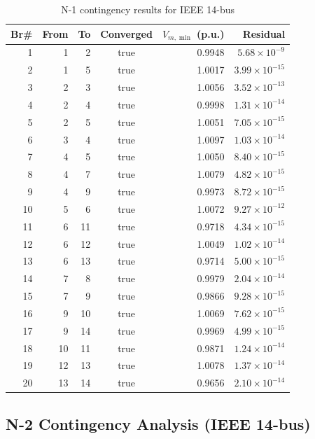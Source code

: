 \documentclass[11pt]{article}
\begin{document}
\begin{table}[h]
\centering
\caption{N-1 contingency results for IEEE 14-bus}
\label{tab:n1_contingency}
\small
\begin{tabular}{r r r c r r}
\toprule
Br\# & From & To & Converged & $V_{m,\min}$ (p.u.) & Residual \\
\midrule
 1 &  1 &  2 & true & 0.9948 & $5.68 \times 10^{-9}$ \\
 2 &  1 &  5 & true & 1.0017 & $3.99 \times 10^{-15}$ \\
 3 &  2 &  3 & true & 1.0056 & $3.52 \times 10^{-13}$ \\
 4 &  2 &  4 & true & 0.9998 & $1.31 \times 10^{-14}$ \\
 5 &  2 &  5 & true & 1.0051 & $7.05 \times 10^{-15}$ \\
 6 &  3 &  4 & true & 1.0097 & $1.03 \times 10^{-14}$ \\
 7 &  4 &  5 & true & 1.0050 & $8.40 \times 10^{-15}$ \\
 8 &  4 &  7 & true & 1.0079 & $4.82 \times 10^{-15}$ \\
 9 &  4 &  9 & true & 0.9973 & $8.72 \times 10^{-15}$ \\
10 &  5 &  6 & true & 1.0072 & $9.27 \times 10^{-12}$ \\
11 &  6 & 11 & true & 0.9718 & $4.34 \times 10^{-15}$ \\
12 &  6 & 12 & true & 1.0049 & $1.02 \times 10^{-14}$ \\
13 &  6 & 13 & true & 0.9714 & $5.00 \times 10^{-15}$ \\
14 &  7 &  8 & true & 0.9979 & $2.04 \times 10^{-14}$ \\
15 &  7 &  9 & true & 0.9866 & $9.28 \times 10^{-15}$ \\
16 &  9 & 10 & true & 1.0069 & $7.62 \times 10^{-15}$ \\
17 &  9 & 14 & true & 0.9969 & $4.99 \times 10^{-15}$ \\
18 & 10 & 11 & true & 0.9871 & $1.24 \times 10^{-14}$ \\
19 & 12 & 13 & true & 1.0078 & $1.37 \times 10^{-14}$ \\
20 & 13 & 14 & true & 0.9656 & $2.10 \times 10^{-14}$ \\
\bottomrule
\end{tabular}
\end{table}

\subsection{N-2 Contingency Analysis (IEEE 14-bus)}
\end{document}
